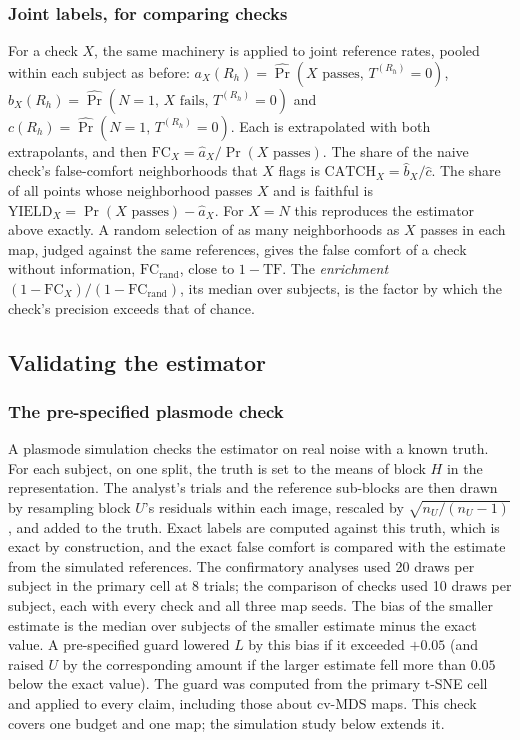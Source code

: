 \documentclass[11pt]{article}
\newcommand{\FC}{\mathrm{FC}}
\begin{document}
\subsubsection{Joint labels, for comparing checks}\label{sec:joint}
For a check $X$, the same machinery is applied to joint reference rates, pooled within each subject as before: $a_X(R_h)=\widehat{\Pr}(X\text{ passes},\,T^{(R_h)}=0)$, $b_X(R_h)=\widehat{\Pr}(N=1,\,X\text{ fails},\,T^{(R_h)}=0)$ and $c(R_h)=\widehat{\Pr}(N=1,\,T^{(R_h)}=0)$.
Each is extrapolated with both extrapolants, and then $\FC_X=\hat a_X/\Pr(X\text{ passes})$.
The share of the naive check's false-comfort neighborhoods that $X$ flags is $\mathrm{CATCH}_X=\hat b_X/\hat c$.
The share of all points whose neighborhood passes $X$ and is faithful is $\mathrm{YIELD}_X=\Pr(X\text{ passes})-\hat a_X$.
For $X=N$ this reproduces the estimator above exactly.
A random selection of as many neighborhoods as $X$ passes in each map, judged against the same references, gives the false comfort of a check without information, $\FC_{\mathrm{rand}}$, close to $1-\mathrm{TF}$.
The \emph{enrichment} $(1-\FC_X)/(1-\FC_{\mathrm{rand}})$, its median over subjects, is the factor by which the check's precision exceeds that of chance.

\subsection{Validating the estimator}\label{sec:val}

\subsubsection{The pre-specified plasmode check}\label{sec:plasmode}
A plasmode simulation \citep{vaughan2009,schreck2024} checks the estimator on real noise with a known truth.
For each subject, on one split, the truth is set to the means of block $H$ in the representation.
The analyst's trials and the reference sub-blocks are then drawn by resampling block $U$'s residuals within each image, rescaled by $\sqrt{n_U/(n_U-1)}$, and added to the truth.
Exact labels are computed against this truth, which is exact by construction, and the exact false comfort is compared with the estimate from the simulated references.
The confirmatory analyses used 20 draws per subject in the primary cell at 8 trials; the comparison of checks used 10 draws per subject, each with every check and all three map seeds.
The bias of the smaller estimate is the median over subjects of the smaller estimate minus the exact value.
A pre-specified guard lowered $L$ by this bias if it exceeded $+0.05$ (and raised $U$ by the corresponding amount if the larger estimate fell more than $0.05$ below the exact value).
The guard was computed from the primary t-SNE cell and applied to every claim, including those about cv-MDS maps.
This check covers one budget and one map; the simulation study below extends it.
\end{document}
